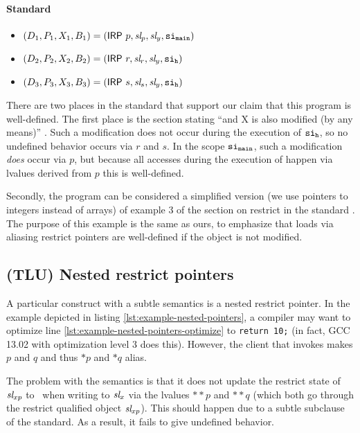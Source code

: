 \newpage

\paragraph{Standard} 
\begin{itemize}
    \itemsep0em
    \item $(D_1, P_1, X_1, B_1) = (\mathsf{IRP} \ p, \textit{sl}_p, \textit{sl}_y, \mathtt{si}_\mathtt{main})$
    \item $(D_2, P_2, X_2, B_2) = (\mathsf{IRP} \ r, \textit{sl}_r, \textit{sl}_y, \mathtt{si}_\mathtt{h})$
    \item $(D_3, P_3, X_3, B_3) = (\mathsf{IRP} \ s, \textit{sl}_s, \textit{sl}_y, \mathtt{si}_\mathtt{h})$
\end{itemize}


There are two places in the standard that support our claim that this program is well-defined. 
The first place is the section stating ``and X is also modified (by any means)\mydots'' \cite[6.7.3.1, p4]{ISO:2018:III}.
Such a modification does not occur during the execution of $\mathtt{si}_\mathtt{h}$, so no undefined behavior occurs via $r$ and $s$.
In the scope $\mathtt{si}_\mathtt{main}$, such a modification \textit{does} occur via $p$, but because all accesses during the execution of
 happen via lvalues derived from $p$ this is well-defined. 

Secondly, the program can be considered a simplified version (we use pointers to integers instead of arrays) of example 3
of the section on restrict in the standard \cite[6.7.3.1]{ISO:2018:III}. The purpose of this example is the same as ours,
\ie to emphasize that loads via aliasing restrict pointers are well-defined if the object is not modified.

\subsection{(TLU) Nested restrict pointers}\label{subsec:cink-nested-restrict-pointers}
A particular construct with a subtle semantics is a nested restrict pointer.
In the example depicted in listing \ref{lst:example-nested-pointers},
a compiler may want to optimize  line \ref{lst:example-nested-pointers-optimize} to \texttt{return 10;} (in fact, GCC 13.02 with optimization level 3 does this).
However, the client  that invokes  makes $p$ and $q$ and thus $*p$ and $*q$ alias.

The problem with the \cink{} semantics is that it does not update the restrict state of $\textit{sl}_{xp}$ to \restrictedn \ when writing
to $\textit{sl}_x$ via the lvalues $\mathbin{**}p$ and $\mathbin{**}q$ (which both go through the restrict qualified
object $\textit{sl}_{xp}$).
This should happen due to a subtle subclause of the standard.
As a result, it fails to give undefined behavior.

